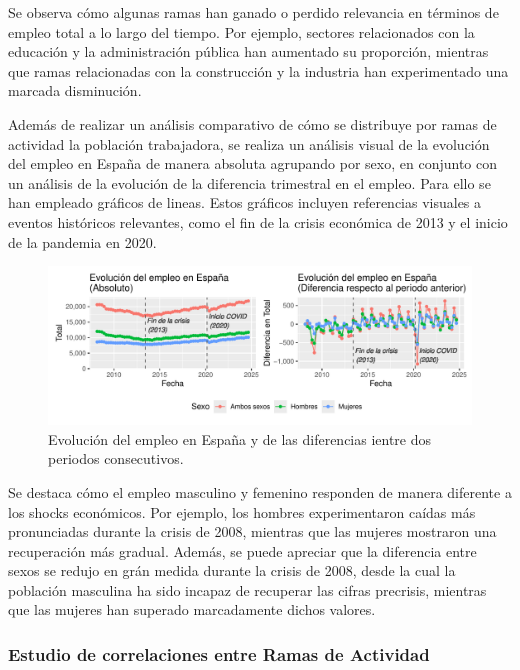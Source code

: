 \documentclass[Universitat de
València,article,submit,moreauthors,pdftex]{Definitions/mdpi}
\begin{document}
Se observa cómo algunas ramas han ganado o perdido relevancia en
términos de empleo total a lo largo del tiempo. Por ejemplo, sectores
relacionados con la educación y la administración pública han aumentado
su proporción, mientras que ramas relacionadas con la construcción y la
industria han experimentado una marcada disminución.

Además de realizar un análisis comparativo de cómo se distribuye por
ramas de actividad la población trabajadora, se realiza un análisis
visual de la evolución del empleo en España de manera absoluta agrupando
por sexo, en conjunto con un análisis de la evolución de la diferencia
trimestral en el empleo. Para ello se han empleado gráficos de lineas.
Estos gráficos incluyen referencias visuales a eventos históricos
relevantes, como el fin de la crisis económica de 2013 y el inicio de la
pandemia en 2020.

\begin{figure}

{\centering \includegraphics{ProyectoAED2024_files/figure-latex/unnamed-chunk-39-1} 

}

\caption{Evolución del empleo en España y de las diferencias ientre dos periodos consecutivos.}\label{fig:unnamed-chunk-39}
\end{figure}

Se destaca cómo el empleo masculino y femenino responden de manera
diferente a los shocks económicos. Por ejemplo, los hombres
experimentaron caídas más pronunciadas durante la crisis de 2008,
mientras que las mujeres mostraron una recuperación más gradual. Además,
se puede apreciar que la diferencia entre sexos se redujo en grán medida
durante la crisis de 2008, desde la cual la población masculina ha sido
incapaz de recuperar las cifras precrisis, mientras que las mujeres han
superado marcadamente dichos valores.

\subsubsection{\texorpdfstring{\textbf{Estudio de correlaciones entre
Ramas de
Actividad}}{Estudio de correlaciones entre Ramas de Actividad}}\label{estudio-de-correlaciones-entre-ramas-de-actividad}
\end{document}
